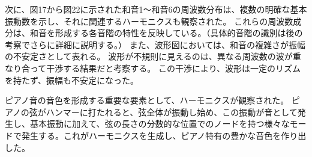 \documentclass{article}
\begin{document}
\begin{spacing}{1.2}
    次に、図17から図22に示された和音1〜和音6の周波数分布は、複数の明確な基本振動数を示し、それに関連するハーモニクスも観察された。
    これらの周波数成分は、和音を形成する各音階の特性を反映している。（具体的音階の識別は後の考察でさらに詳細に説明する。）
    また、波形図においては、和音の複雑さが振幅の不安定さとして表れる。
    波形が不規則に見えるのは、異なる周波数の波が重なり合って干渉する結果だと考察する。
    この干渉により、波形は一定のリズムを持たず、振幅も不安定になった。
    
    ピアノ音の音色を形成する重要な要素として、ハーモニクスが観察された。
    ピアノの弦がハンマーに打たれると、弦全体が振動し始め、この振動が音として発生し、基本振動に加えて、弦の長さの分数的な位置でのノードを持つ様々なモードで発生する。これがハーモニクスを生成し、ピアノ特有の豊かな音色を作り出した。
    \end{spacing}
\vspace{110pt} %
\end{document}
